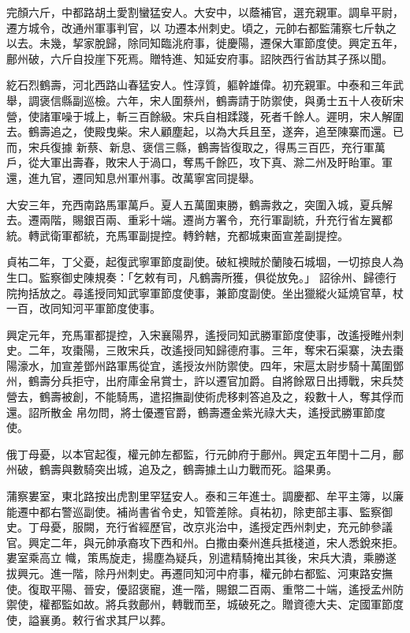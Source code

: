 \begin{pinyinscope}
 完顏六斤，中都路胡土愛割蠻猛安人。大安中，以蔭補官，選充親軍。調阜平尉，遷方城令，改通州軍事判官，以
 功遷本州刺史。頃之，元帥右都監蒲察七斤執之以去。未幾，挈家脫歸，除同知臨洮府事，徙慶陽，遷保大軍節度使。興定五年，鄜州破，六斤自投崖下死焉。贈特進、知延安府事。詔陜西行省訪其子孫以聞。



 紇石烈鶴壽，河北西路山春猛安人。性淳質，軀幹雄偉。初充親軍。中泰和三年武舉，調褒信縣副巡檢。六年，宋人圍蔡州，鶴壽請于防禦使，與勇士五十人夜斫宋營，使諸軍噪于城上，斬三百餘級。宋兵自相蹂踐，死者千餘人。遲明，宋人解圍去。鶴壽追之，使殿曳柴。宋人顧塵起，以為大兵且至，遂奔，追至陳寨而還。已而，宋兵復據
 新蔡、新息、褒信三縣，鶴壽皆復取之，得馬三百匹，充行軍萬戶，從大軍出壽春，敗宋人于渦口，奪馬千餘匹，攻下真、滁二州及盱眙軍。軍還，進九官，遷同知息州軍州事。改萬寧宮同提舉。



 大安三年，充西南路馬軍萬戶。夏人五萬圍東勝，鶴壽救之，突圍入城，夏兵解去。遷兩階，賜銀百兩、重彩十端。遷尚方署令，充行軍副統，升充行省左翼都統。轉武衛軍都統，充馬軍副提控。轉鈐轄，充都城東面宣差副提控。



 貞祐二年，丁父憂，起復武寧軍節度副使。破紅襖賊於蘭陵石城堌，一切掠良人為生口。監察御史陳規奏：「乞敕有司，凡鶴壽所獲，俱從放免。」
 詔徐州、歸德行院拘括放之。尋遙授同知武寧軍節度使事，兼節度副使。坐出獵縱火延燒官草，杖一百，改同知河平軍節度使事。



 興定元年，充馬軍都提控，入宋襄陽界，遙授同知武勝軍節度使事，改遙授睢州刺史。二年，攻棗陽，三敗宋兵，改遙授同知歸德府事。三年，奪宋石渠寨，決去棗陽濠水，加宣差鄧州路軍馬從宜，遙授汝州防禦使。四年，宋扈太尉步騎十萬圍鄧州，鶴壽分兵拒守，出府庫金帛賞士，許以遷官加爵。自將餘眾日出搏戰，宋兵焚營去，鶴壽被創，不能騎馬，遣招撫副使術虎移剌答追及之，殺數十人，奪其俘而還。詔所散金
 帛勿問，將士優遷官爵，鶴壽遷金紫光祿大夫，遙授武勝軍節度使。



 俄丁母憂，以本官起復，權元帥左都監，行元帥府于鄜州。興定五年閏十二月，鄜州破，鶴壽與數騎突出城，追及之，鶴壽據土山力戰而死。謚果勇。



 蒲察婁室，東北路按出虎割里罕猛安人。泰和三年進士。調慶都、牟平主簿，以廉能遷中都右警巡副使。補尚書省令史，知管差除。貞祐初，除吏部主事、監察御史。丁母憂，服闕，充行省經歷官，改京兆治中，遙授定西州刺史，充元帥參議官。興定二年，與元帥承裔攻下西和州。白撒由秦州進兵抵棧道，宋人悉銳來拒。婁室乘高立
 幟，策馬旋走，揚塵為疑兵，別遣精騎掩出其後，宋兵大潰，乘勝遂拔興元。進一階，除丹州刺史。再遷同知河中府事，權元帥右都監、河東路安撫使。復取平陽、晉安，優詔褒寵，進一階，賜銀二百兩、重幣二十端，遙授孟州防禦使，權都監如故。將兵救鄜州，轉戰而至，城破死之。贈資德大夫、定國軍節度使，謚襄勇。敕行省求其尸以葬。




\end{pinyinscope}
